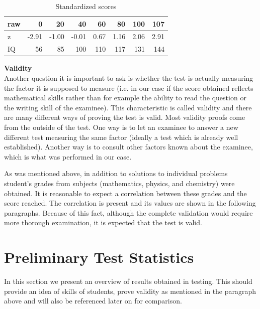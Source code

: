 \begin{table}[htbp]
  \centering
  \caption{Standardized scores}
	\label{tab:scores}
    \begin{tabular}{lrrrrrrr}
		\hline
    raw&0&20&40&60&80&100&107\\
    \hline
    z&-2.91&-1.00&-0.01&0.67&1.16&2.06&2.91\\
    IQ&56&85&100&110&117&131&144\\
    \hline
    \end{tabular}%
  \label{tab:addlabel}%
\end{table}%


\textbf{Validity}\\
Another question it is important to ask is whether the test is actually measuring the factor it is supposed to measure (i.e. in our case if the score obtained reflects mathematical skills rather than for example the ability to read the question or the writing skill of the examinee). This characteristic is called validity and there are many different ways of proving the test is valid. Most validity proofs come from the outside of the test. One way is to let an examinee to answer a new different test measuring the same factor (ideally a test which is already well established). Another way is to consult other factors known about the examinee, which is what was performed in our case.

As was mentioned above, in addition to solutions to individual problems student's grades from subjects (mathematics, physics, and chemistry) were obtained. It is reasonable to expect a correlation between these grades and the score reached. The correlation is present and its values are shown in the following paragraphs. Because of this fact, although the complete validation would require more thorough examination, it is expected that the test is valid.

\section{Preliminary Test Statistics}
In this section we present an overview of results obtained in testing. This should provide an idea of skills of students, prove validity as mentioned in the paragraph above and will also be referenced later on for comparison.



